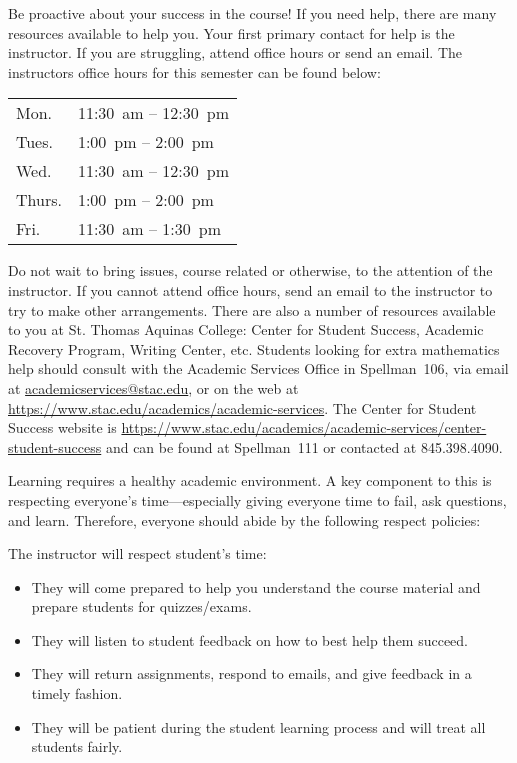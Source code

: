 \documentclass[11pt,letterpaper]{article}
\begin{document}
Be proactive about your success in the course! If you need help, there are many resources available to help you. Your first primary contact for help is the instructor. If you are struggling, attend office hours or send an email. The instructors office hours for this semester can be found below: \par
	\begin{table}[!ht]
	\centering
	\begin{tabular}{l || l}
	Mon. & 11:30~am -- 12:30~pm \\
	Tues. & 1:00~pm -- 2:00~pm \\
	Wed. & 11:30~am -- 12:30~pm \\
	Thurs. & 1:00~pm -- 2:00~pm \\
	Fri. & 11:30~am -- 1:30~pm
	\end{tabular}
	\end{table}
Do not wait to bring issues, course related or otherwise, to the attention of the instructor. If you cannot attend office hours, send an email to the instructor to try to make other arrangements. There are also a number of resources available to you at St. Thomas Aquinas College: Center for Student Success, Academic Recovery Program, Writing Center, etc. Students looking for extra mathematics help should consult with the Academic Services Office in Spellman~106, via email at \href{mailto:AcademicServices@stac.edu}{academicservices@stac.edu}, or on the web at \href{https://www.stac.edu/academics/academic-services}{https://www.stac.edu/academics/academic-services}. The Center for Student Success website is \url{https://www.stac.edu/academics/academic-services/center-student-success} and can be found at Spellman~111 or contacted at 845.398.4090. \sectionbreak




\newpage



Learning requires a healthy academic environment. A key component to this is respecting everyone's time---especially giving everyone time to fail, ask questions, and learn. Therefore, everyone should abide by the following respect policies: \pspace

The instructor will respect student's time:
	\begin{itemize}
	\item They will come prepared to help you understand the course material and prepare students for quizzes/exams. 
	\item They will listen to student feedback on how to best help them succeed. 
	\item They will return assignments, respond to emails, and give feedback in a timely fashion. 
	\item They will be patient during the student learning process and will treat all students fairly. 
	\end{itemize} \pspace
\end{document}
